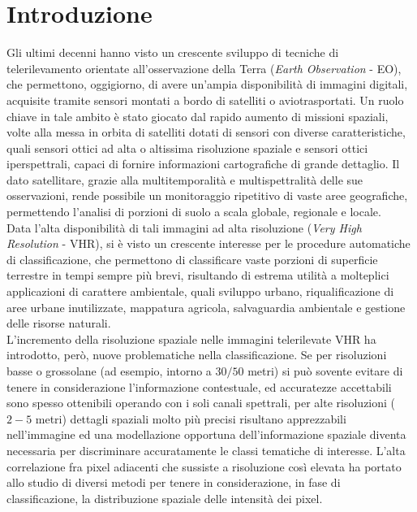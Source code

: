 

\chapter*{Introduzione}
\label{Introduzione}

Gli ultimi decenni hanno visto un crescente sviluppo di tecniche di telerilevamento orientate all'osservazione della Terra (\emph{Earth Observation} - EO), che permettono, oggigiorno, di avere un'ampia disponibilità di immagini digitali, acquisite tramite sensori montati a bordo di satelliti o aviotrasportati.
Un ruolo chiave in tale ambito è stato giocato dal rapido aumento di missioni spaziali, volte alla messa in orbita di satelliti dotati di sensori con diverse caratteristiche, quali sensori ottici ad alta o altissima risoluzione spaziale e sensori ottici iperspettrali, capaci di fornire informazioni cartografiche di grande dettaglio. 
Il dato satellitare, grazie alla multitemporalità e multispettralità delle sue osservazioni, rende possibile un monitoraggio ripetitivo di vaste aree geografiche, permettendo l'analisi di porzioni di suolo a scala globale, regionale e locale.\\
Data l'alta disponibilità di tali immagini ad alta risoluzione (\emph{Very High Resolution} - VHR), si è visto un crescente interesse per le procedure automatiche di classificazione, che permettono di classificare vaste porzioni di superficie terrestre in tempi sempre più brevi, risultando di estrema utilità a molteplici applicazioni di carattere ambientale, quali sviluppo urbano, riqualificazione di aree urbane inutilizzate, mappatura agricola, salvaguardia ambientale e gestione delle risorse naturali.\\
L'incremento della risoluzione spaziale nelle immagini telerilevate VHR ha introdotto, però, nuove problematiche nella classificazione. Se per risoluzioni basse o grossolane (ad esempio, intorno a $30/50$ metri) si può sovente evitare di tenere in considerazione l'informazione contestuale, ed accuratezze accettabili sono spesso ottenibili operando con i soli canali spettrali, per alte risoluzioni ($2-5$ metri) dettagli spaziali molto più precisi risultano apprezzabili nell'immagine ed una modellazione opportuna dell'informazione spaziale diventa necessaria per discriminare accuratamente le classi tematiche di interesse.
L'alta correlazione fra pixel adiacenti che sussiste a risoluzione così elevata ha portato allo studio di diversi metodi per tenere in considerazione, in fase di classificazione, la distribuzione spaziale delle intensità dei pixel.\\
